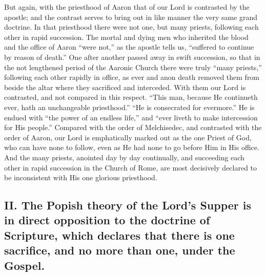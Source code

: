 \documentclass[]{book}
\begin{document}
But again, with the priesthood of Aaron that of our Lord is contrasted by the apostle; and the contrast serves to bring out in like manner the very same grand doctrine. In that priesthood there were not one, but many priests, following each other in rapid succession. The mortal and dying men who inherited the blood and the office of Aaron ``were not,'' as the apostle tells us, ``suffered to continue by reason of death.'' One after another passed away in swift succession, so that in the not lengthened period of the Aaronic Church there were truly ``many priests,'' following each other rapidly in office, as ever and anon death removed them from beside the altar where they sacrificed and interceded. With them our Lord is contrasted, and not compared in this respect. ``This man, because He continueth ever, hath an unchangeable priesthood.'' ``He is consecrated for evermore.'' He is endued with ``the power of an endless life,'' and ``ever liveth to make intercession for His people.'' Compared with the order of Melchisedec, and contrasted with the order of Aaron, our Lord is emphatically marked out as the one Priest of God, who can have none to follow, even as He had none to go before Him in His office. And the many priests, anointed day by day continually, and succeeding each other in rapid succession in the Church of Rome, are most decisively declared to be inconsistent with His one glorious priesthood.

\hypertarget{ii.-the-popish-theory-of-the-lords-supper-is-in-direct-opposition-to-the-doctrine-of-scripture-which-declares-that-there-is-one-sacrifice-and-no-more-than-one-under-the-gospel.}{%
\subsection{II. The Popish theory of the Lord's Supper is in direct opposition to the doctrine of Scripture, which declares that there is one sacrifice, and no more than one, under the Gospel.}\label{ii.-the-popish-theory-of-the-lords-supper-is-in-direct-opposition-to-the-doctrine-of-scripture-which-declares-that-there-is-one-sacrifice-and-no-more-than-one-under-the-gospel.}}
\end{document}
